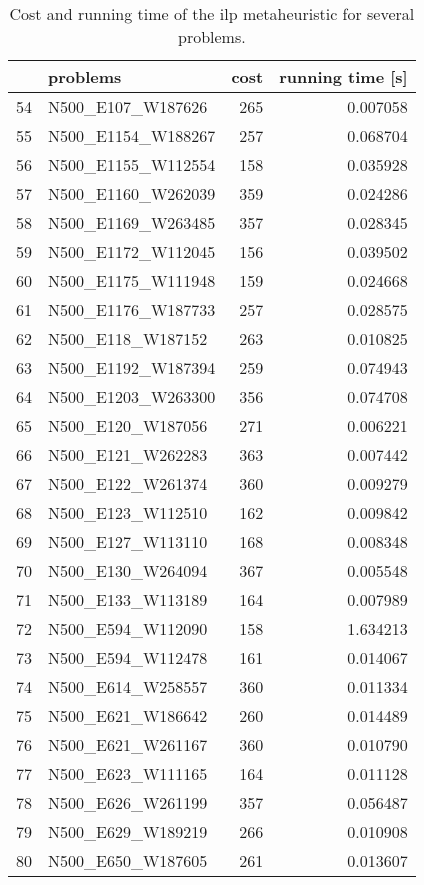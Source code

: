 \begin{table}[H]
\centering
\begin{tabular}{llrr}
\toprule
{} &            problems &  cost &  running time [s] \\
\midrule
54 &   N500\_E107\_W187626 &   265 &          0.007058 \\
55 &  N500\_E1154\_W188267 &   257 &          0.068704 \\
56 &  N500\_E1155\_W112554 &   158 &          0.035928 \\
57 &  N500\_E1160\_W262039 &   359 &          0.024286 \\
58 &  N500\_E1169\_W263485 &   357 &          0.028345 \\
59 &  N500\_E1172\_W112045 &   156 &          0.039502 \\
60 &  N500\_E1175\_W111948 &   159 &          0.024668 \\
61 &  N500\_E1176\_W187733 &   257 &          0.028575 \\
62 &   N500\_E118\_W187152 &   263 &          0.010825 \\
63 &  N500\_E1192\_W187394 &   259 &          0.074943 \\
64 &  N500\_E1203\_W263300 &   356 &          0.074708 \\
65 &   N500\_E120\_W187056 &   271 &          0.006221 \\
66 &   N500\_E121\_W262283 &   363 &          0.007442 \\
67 &   N500\_E122\_W261374 &   360 &          0.009279 \\
68 &   N500\_E123\_W112510 &   162 &          0.009842 \\
69 &   N500\_E127\_W113110 &   168 &          0.008348 \\
70 &   N500\_E130\_W264094 &   367 &          0.005548 \\
71 &   N500\_E133\_W113189 &   164 &          0.007989 \\
72 &   N500\_E594\_W112090 &   158 &          1.634213 \\
73 &   N500\_E594\_W112478 &   161 &          0.014067 \\
74 &   N500\_E614\_W258557 &   360 &          0.011334 \\
75 &   N500\_E621\_W186642 &   260 &          0.014489 \\
76 &   N500\_E621\_W261167 &   360 &          0.010790 \\
77 &   N500\_E623\_W111165 &   164 &          0.011128 \\
78 &   N500\_E626\_W261199 &   357 &          0.056487 \\
79 &   N500\_E629\_W189219 &   266 &          0.010908 \\
80 &   N500\_E650\_W187605 &   261 &          0.013607 \\
\bottomrule
\end{tabular}
\caption{Cost and running time of the ilp metaheuristic for several problems.}
\label{table:ilp-medium-results-III}
\end{table}

